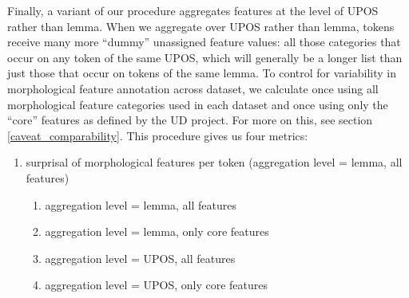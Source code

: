 \documentclass[USenglish]{article}
\begin{document}
Finally, a variant of our procedure aggregates features at the level of UPOS rather than lemma.
When we aggregate over UPOS rather than lemma, tokens receive many more ``dummy'' unassigned feature values: all those categories that occur on any token of the same UPOS, which will generally be a longer list than just those that occur on tokens of the same lemma.
To control for variability in morphological feature annotation across dataset, we calculate once using all morphological feature categories used in each dataset and once using only the ``core'' features as defined by the UD project. For more on this, see section \ref{caveat_comparability}.
This procedure gives us four metrics:

\begin{enumerate}
    \item surprisal of morphological features per token (aggregation level = lemma, all features)
    \begin{enumerate}
  \renewcommand{\labelenumi}{\alph{enumi})}
  \item aggregation level = lemma, all features
  \item aggregation level = lemma, only core features
  \item aggregation level = UPOS, all features
  \item aggregation level = UPOS, only core features
\end{enumerate}
\end{enumerate}
\end{document}
